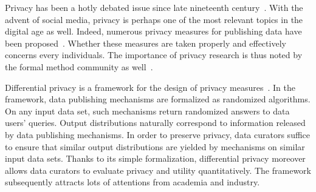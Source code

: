 

Privacy has been a hotly debated issue since late nineteenth
century~\cite{WB:90:RP}. With the advent of social media, privacy is
perhaps one of the most relevant topics in the digital age as
well. Indeed, numerous privacy measures for publishing data 
have been proposed~\cite{S:2002:KAMPP,FWC:10:PPDP}. Whether these
measures are taken properly and effectively concerns every
individuals. The importance of privacy research is thus noted by the
formal method community as well~\cite{TW:09:FMP}.


Differential privacy is a framework for the design of privacy
measures~\cite{D:06:DP,DR:14:AFDP}. In the framework, data publishing
mechanisms are formalized as randomized algorithms. On any input data
set, such mechanisms return randomized answers to data users' queries. 
Output distributions naturally correspond to information released by
data publishing mechanisms. In order to preserve privacy, data
curators suffice to ensure that similar output distributions are
yielded by mechanisms on similar input data sets. Thanks to its simple
formalization, differential privacy moreover allows data curators 
to evaluate privacy and utility quantitatively. The framework
subsequently attracts lots of attentions from academia and industry.







